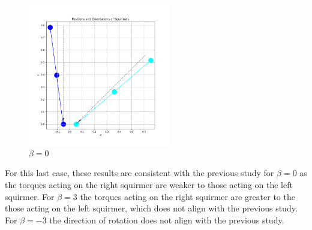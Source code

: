 \documentclass{article}
\begin{document}
\begin{figure}[H]
    \centering
    \includegraphics[width=0.55\textwidth]{graphs/simulations/sim_sq_sq/beta0/pi_4_.png}
    \caption{\footnotesize $\beta = 0$}
\end{figure}
For this last case, these results are consistent with the previous study\cite{Stark} for $\beta = 0$ as the torques acting on the right 
squirmer are weaker to those acting on the left squirmer. For $\beta = 3$ the torques acting on the right squirmer are
greater to the those acting on the left squirmer, which does not align with the previous study.
For $\beta = -3$ the direction of rotation does not align with the previous study.
\end{document}
